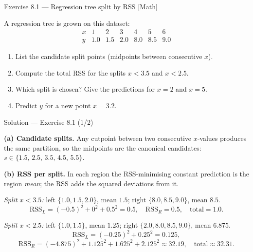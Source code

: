 \documentclass[aspectratio=169,11pt]{beamer}
\begin{document}
\begin{frame}{Exercise 8.1 --- Regression tree split by RSS [Math]}
\begin{exercise}
A regression tree is grown on this dataset:
\[
\begin{array}{c|cccccc}
x & 1 & 2 & 3 & 4 & 5 & 6\\\hline
y & 1.0 & 1.5 & 2.0 & 8.0 & 8.5 & 9.0
\end{array}
\]
\begin{enumerate}
  \item List the candidate split points (midpoints between consecutive $x$).
  \item Compute the total RSS for the splits $x<3.5$ and $x<2.5$.
  \item Which split is chosen? Give the predictions for $x=2$ and $x=5$.
  \item Predict $y$ for a new point $x=3.2$.
\end{enumerate}
\end{exercise}
\end{frame}

\begin{frame}{Solution --- Exercise 8.1 (1/2)}
\begin{solutionbox}
\textbf{(a) Candidate splits.} Any cutpoint between two consecutive $x$-values produces the same partition, so the midpoints are the canonical candidates: $s\in\{1.5,\,2.5,\,3.5,\,4.5,\,5.5\}$.

\medskip
\textbf{(b) RSS per split.} In each region the RSS-minimising constant prediction is the region \emph{mean}; the RSS adds the squared deviations from it.

\emph{Split $x<3.5$:} left $\{1.0,1.5,2.0\}$, mean $1.5$; right $\{8.0,8.5,9.0\}$, mean $8.5$.
\[ \mathrm{RSS}_L=(-0.5)^2+0^2+0.5^2=0.5,\quad \mathrm{RSS}_R=0.5,\quad \text{total}=1.0. \]

\emph{Split $x<2.5$:} left $\{1.0,1.5\}$, mean $1.25$; right $\{2.0,8.0,8.5,9.0\}$, mean $6.875$.
\[ \mathrm{RSS}_L=(-0.25)^2+0.25^2=0.125, \]
\[ \mathrm{RSS}_R=(-4.875)^2+1.125^2+1.625^2+2.125^2\approx 32.19,\quad \text{total}\approx 32.31. \]
\end{solutionbox}
\end{frame}
\end{document}
